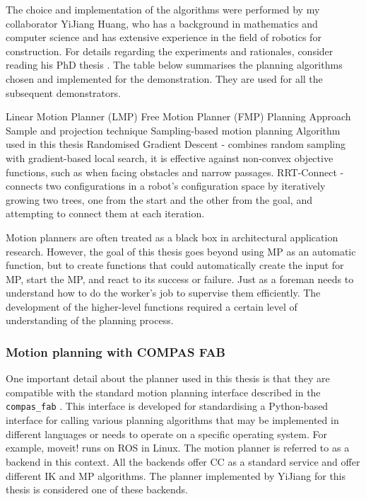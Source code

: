 The choice and implementation of the algorithms were performed by my collaborator YiJiang Huang, who has a background in mathematics and computer science and has extensive experience in the field of robotics for construction. For details regarding the experiments and rationales, consider reading his PhD thesis \parencite{huangAlgorithmicPlanningRobotic2022}. The table below summarises the planning algorithms chosen and implemented for the demonstration. They are used for all the subsequent demonstrators.

Linear Motion Planner (LMP)
Free Motion Planner (FMP)
Planning Approach
Sample and projection technique
Sampling-based motion planning
Algorithm used in this thesis
Randomised Gradient Descent \parencite{yaoPathPlanningGeneral2007} - combines random sampling with gradient-based local search, it is effective against non-convex objective functions, such as when facing obstacles and narrow passages.
RRT-Connect \parencite{kuffnerjr.RRTConnectEfficientApproach2000} - connects two configurations in a robot's configuration space by iteratively growing two trees, one from the start and the other from the goal, and attempting to connect them at each iteration.

Motion planners are often treated as a black box in architectural application research. However, the goal of this thesis goes beyond using MP as an automatic function, but to create functions that could automatically create the input for MP, start the MP, and react to its success or failure. Just as a foreman needs to understand how to do the worker’s job to supervise them efficiently. The development of the higher-level functions required a certain level of understanding of the planning process.

\subsubsection{Motion planning with COMPAS FAB}
\label{subsubsection:exploration-2-motion-planning-with-compas-fab}


One important detail about the planner used in this thesis is that they are compatible with the standard motion planning interface described in the \verb|compas_fab| \parencite{rustCOMPASFABRobotic2018}. This interface is developed for standardising a Python-based interface for calling various planning algorithms that may be implemented in different languages or needs to operate on a specific operating system. For example, moveit! \parencite{sucanMoveit2018} runs on ROS \parencite{quigleyROSOpensourceRobot2009} in Linux. The motion planner is referred to as a backend in this context. All the backends offer CC as a standard service and offer different IK and MP algorithms. The planner implemented by YiJiang \parencite{huangCompas_fab_pychoreo2023} for this thesis is considered one of these backends. 

